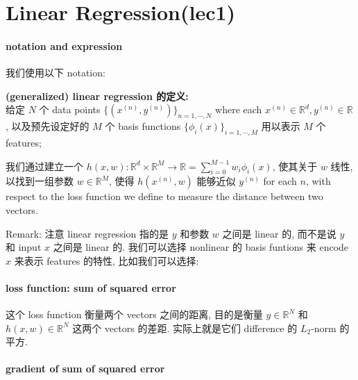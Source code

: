 \documentclass[lang=cn,11pt]{elegantbook}
\author{}
\date{}
\begin{document}
\chapter{Linear Regression(lec1)}\label{linear-regressionlec1}

\hypertarget{notation-and-expression}{%
\subsubsection{notation and expression}\label{notation-and-expression}}

我们使用以下 notation:


\textbf{(generalized) linear regression 的定义:}\\
给定 \(N\) 个 data points \(\{(x^{(n)},y^{(n)}) \}_{n=1,\cdots, N}\)
where each \(x^{(n)}\in\mathbb{R}^d,y^{(n)}  \in\mathbb{R}\),
以及预先设定好的 \(M\) 个 basis functions
\(\{ \phi_i(x)\}_{i=1,\cdots, M}\) 用以表示 \(M\) 个 features;

我们通过建立一个
\(h(x,w): \mathbb{R}^d \times \mathbb{R}^M \rightarrow  \mathbb{R} = \sum_{i=0}^{M-1} w_i \phi_i(x)\),
使其关于 \(w\) 线性, 以找到一组参数 \(w \in \mathbb{R}^M\), 使得
\(h(x^{(n)},w)\) 能够近似 \(y^{(n)}\) for each \(n\), with respect to
the loss function we define to measure the distance between two vectors.


Remark: 注意 linear regression 指的是 \(y\) 和参数 \(w\) 之间是 linear
的, 而不是说 \(y\) 和 input \(x\) 之间是 linear 的. 我们可以选择
nonlinear 的 basis funtions 来 encode \(x\) 来表示 features 的特性,
比如我们可以选择:


\hypertarget{loss-function-sum-of-squared-error}{%
\subsubsection{loss function: sum of squared
error}\label{loss-function-sum-of-squared-error}}

这个 loss function 衡量两个 vectors 之间的距离, 目的是衡量
\(y \in \mathbb{R}^N\) 和 \(h(x,w) \in \mathbb{R}^N\) 这两个 vectors
的差距. 实际上就是它们 difference 的 \(L_2\)-norm 的平方.


\hypertarget{gradient-of-sum-of-squared-error}{%
\subsubsection{gradient of sum of squared
error}\label{gradient-of-sum-of-squared-error}}
\end{document}
